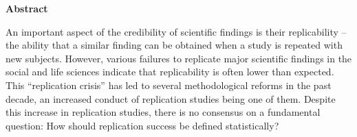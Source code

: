 
\cleardoublepage
{}

\enlargethispage{4\baselineskip}
\begin{center}\abstractnamefont
  \textbf{Abstract}
\end{center}

An important aspect of the credibility of scientific findings is their
replicability -- the ability that a similar finding can be obtained when a study
is repeated with new subjects. However, various failures to replicate major
scientific findings in the social and life sciences indicate that replicability
is often lower than expected. This ``replication crisis'' has led to several
methodological reforms in the past decade, an increased conduct of replication
studies being one of them. Despite this increase in replication studies, there
is no consensus on a fundamental question: How should replication success be
defined statistically?

